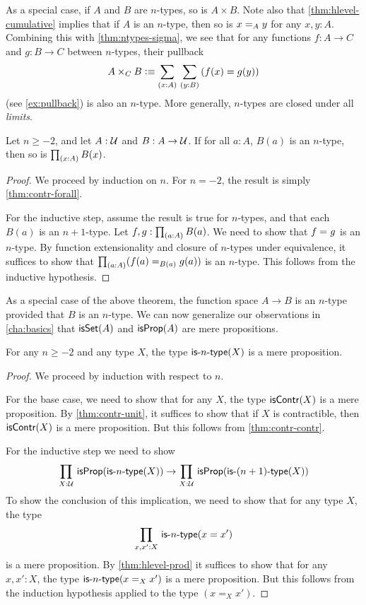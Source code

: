 As a special case, if $A$ and $B$ are $n$-types, so is $A\times B$.
Note also that \autoref{thm:hlevel-cumulative} implies that if $A$ is an $n$-type, then so is $\id[A]xy$ for any $x,y:A$.
Combining this with \autoref{thm:ntypes-sigma}, we see that for any functions $f:A\to C$ and $g:B\to C$ between $n$-types, their pullback
\[ A\times_C B \defeq \sm{x:A}{y:B} (f(x)=g(y)) \]
(see \autoref{ex:pullback}) is also an $n$-type.
More generally, $n$-types are closed under all \emph{limits}.

\begin{thm}\label{thm:hlevel-prod}
 Let $n\geq -2$, and let $A : \type$ and $B : A \to \type$.
 If for all $a : A$, $B(a)$ is an $n$-type, then so is $\prd{x : A} B(x)$.
\end{thm}

\begin{proof}
  We proceed by induction on $n$.
  For $n = -2$, the result is simply \autoref{thm:contr-forall}.

  For the inductive step, assume the result is true for $n$-types, and that each $B(a)$ is an $n+1$-type.
  Let $f, g : \prd{a:A}B(a)$.
  We need to show that $\id{f}{g}$ is an $n$-type.
  By function extensionality and closure of $n$-types under equivalence, it suffices to show that $\prd{a : A} (\id[B(a)]{f(a)}{g(a)})$ is an $n$-type.
  This follows from the inductive hypothesis.
\end{proof}

As a special case of the above theorem, the function space $A \to B$ is an $n$-type provided that $B$ is an $n$-type.
We can now generalize our observations in \autoref{cha:basics} that $\isset(A)$ and $\isprop(A)$ are mere propositions.

\begin{thm}\label{thm:isaprop-isofhlevel}
 For any $n \geq -2$ and any type $X$, the type $\istype{n}(X)$ is a mere proposition.
\end{thm}
\begin{proof}
  We proceed by induction with respect to $n$.

 For the base case, we need to show that for any $X$, the type $\iscontr(X)$ is a mere proposition.
 By \autoref{thm:contr-unit}, it suffices to show that if $X$ is contractible, then $\iscontr(X)$ is a mere proposition.
 But this follows from \autoref{thm:contr-contr}.

For the inductive step we need to show
\[\prd{X : \type} \isprop (\istype{n}(X)) \to \prd{X : \type} \isprop (\istype{\nplusone}(X)) \]
To show the conclusion of this implication, we need to show that for any type $X$, the type
\[\prd{x, x' : X}\istype{n}(x = x')\]
is a mere proposition. By \autoref{thm:hlevel-prod} it suffices to show that for any $x, x' : X$, the type $\istype{n}(x =_X x')$ is a mere
proposition.
But this follows from the induction hypothesis applied to the type $(x =_X x')$.
\end{proof}

